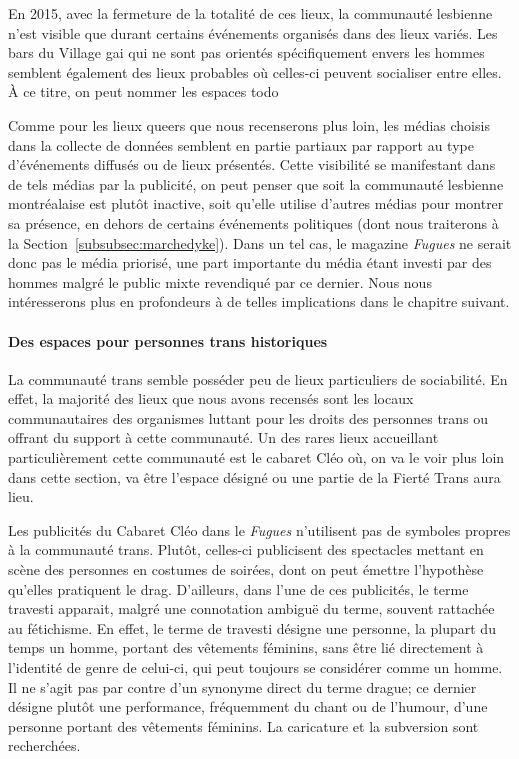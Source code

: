 En 2015, avec la fermeture de la totalité de ces lieux, la communauté lesbienne n'est visible que durant certains événements organisés dans des lieux variés.
Les bars du Village gai qui ne sont pas orientés spécifiquement envers les hommes semblent également des lieux probables où celles-ci peuvent socialiser entre elles.
À ce titre, on peut nommer les espaces todo 

Comme pour les lieux queers que nous recenserons plus loin, les médias choisis dans la collecte de données semblent en partie partiaux par rapport au type d'événements diffusés ou de lieux présentés.
Cette visibilité se manifestant dans de tels médias par la publicité, on peut penser que soit la communauté lesbienne montréalaise est plutôt inactive, soit qu'elle utilise d'autres médias pour montrer sa présence, en dehors de certains événements politiques (dont nous traiterons à la Section~\ref{subsubsec:marchedyke}).
Dans un tel cas, le magazine \emph{Fugues} ne serait donc pas le média priorisé, une part importante du média étant investi par des hommes malgré le public mixte revendiqué par ce dernier.
Nous nous intéresserons plus en profondeurs à de telles implications dans le chapitre suivant.

\paragraph{Des espaces pour personnes trans historiques}
La communauté trans semble posséder peu de lieux particuliers de sociabilité.
En effet, la majorité des lieux que nous avons recensés sont les locaux communautaires des organismes luttant pour les droits des personnes trans ou offrant du support à cette communauté.
Un des rares lieux accueillant particulièrement cette communauté est le cabaret Cléo où, on va le voir plus loin dans cette section, va être l'espace désigné ou une partie de la Fierté Trans aura lieu.

Les publicités du Cabaret Cléo dans le \emph{Fugues} n'utilisent pas de symboles propres à la communauté trans.
Plutôt, celles-ci publicisent des spectacles mettant en scène des personnes en costumes de soirées, dont on peut émettre l'hypothèse qu'elles pratiquent le drag.
D'ailleurs, dans l'une de ces publicités, le terme travesti apparait, malgré une connotation ambiguë du terme, souvent rattachée au fétichisme.
En effet, le terme de travesti désigne une personne, la plupart du temps un homme, portant des vêtements féminins, sans être lié directement à l'identité de genre de celui-ci, qui peut toujours se considérer comme un homme.
Il ne s'agit pas par contre d'un synonyme direct du terme drague; ce dernier désigne plutôt une performance, fréquemment du chant ou de l'humour, d'une personne portant des vêtements féminins.
La caricature et la subversion sont recherchées.

